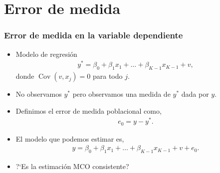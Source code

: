 \documentclass[t, compress, spanish, aspectratio=169]{beamer}
\DeclareMathOperator{\Cov}{Cov}
\begin{document}
%
%
\section{Error de medida}
\begin{frame}
    \frametitle{Error de medida en la variable dependiente}
    \small
    \begin{itemize}  
        \item Modelo de regresi\'on
        \begin{align*}
            y^* = \beta_0 + \beta_1 x_{1}+\dots+ \beta_{K-1} x_{K-1}+v,
        \end{align*}
        donde $\Cov(v, x_{j})=0$ para todo $j$.
        \item No observamos $y^*$ pero observamos una medida de $y^*$ dada por $y$.
        \item Definimos el error de medida poblacional como,
        \begin{align*}
            e_{0} = y-y^*.
        \end{align*}
        \item [] El modelo que podemos estimar es,
        \begin{align*}
            y = \beta_0 + \beta_1 x_{1}+\dots+ \beta_{K-1} x_{K-1}+v+e_{0}.
        \end{align*}
        \item ?`Es la estimaci\'on MCO consistente?
        \end{itemize}
\end{frame}

%
%
%
\end{document}
